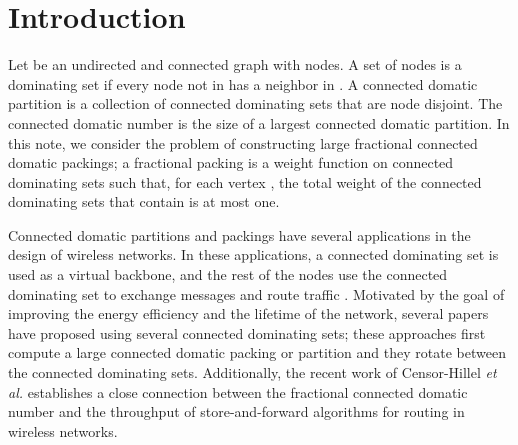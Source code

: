 \documentclass[11pt]{article}
\def\etal{\emph{et al.}\xspace}
\begin{document}
\newpage
\setcounter{page}{1}

\section{Introduction}
\label{sec:intro}

Let  be an undirected and connected graph with  nodes.
A set  of nodes is a dominating set if every node not in  has a
neighbor in . A connected domatic partition is a collection of
connected dominating sets that are node disjoint. The connected
domatic number is the size of a largest connected domatic partition.
In this note, we consider the problem of constructing large
fractional connected domatic packings; a fractional packing is a
weight function on connected dominating sets such that, for each
vertex , the total weight of the connected dominating sets that
contain  is at most one.

Connected domatic partitions and packings have several applications
in the design of wireless networks. In these applications, a
connected dominating set is used as a virtual backbone, and the rest
of the nodes use the connected dominating set to exchange messages
and route traffic \cite{DasB97,DasSB97,MahjoubM10}.  Motivated by the
goal of improving the energy efficiency and the lifetime of the
network, several papers \cite{MisraM09,MoscibrodaW05,PemmarajuP06}
have proposed using several connected dominating sets; these
approaches first compute a large connected domatic packing or
partition and they rotate between the connected dominating sets.
Additionally, the recent work of Censor-Hillel \etal \cite{CHGK}
establishes a close connection between the fractional connected
domatic number and the throughput of store-and-forward algorithms for
routing in wireless networks.
\end{document}
